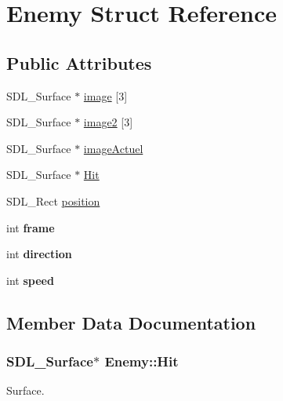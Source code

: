 \hypertarget{structEnemy}{}\section{Enemy Struct Reference}
\label{structEnemy}
\subsection*{Public Attributes}
\begin{DoxyCompactItemize}
\item 
S\+D\+L\+\_\+\+Surface $\ast$ \hyperlink{structEnemy_afc1cf868e4b6602d2166ee9cfbf1d06e}{image} \mbox{[}3\mbox{]}
\item 
S\+D\+L\+\_\+\+Surface $\ast$ \hyperlink{structEnemy_a43bdca7bc81657fccdb7d8cb7369f673}{image2} \mbox{[}3\mbox{]}
\item 
S\+D\+L\+\_\+\+Surface $\ast$ \hyperlink{structEnemy_ab8d7f9eceeef8f17331210f3f1fd2cf3}{image\+Actuel}
\item 
S\+D\+L\+\_\+\+Surface $\ast$ \hyperlink{structEnemy_a62ed00c1aa4ac7bb90cb132c6c56b21d}{Hit}
\item 
S\+D\+L\+\_\+\+Rect \hyperlink{structEnemy_ac364f2ddf130c8622889deca0b6ba4d0}{position}
\item 
int {\bfseries frame}\hypertarget{structEnemy_a554574b1537da808a14f909b8a701735}{}\label{structEnemy_a554574b1537da808a14f909b8a701735}

\item 
int {\bfseries direction}\hypertarget{structEnemy_a1de1605c4b41f74c3b0f4023258323ab}{}\label{structEnemy_a1de1605c4b41f74c3b0f4023258323ab}

\item 
int {\bfseries speed}\hypertarget{structEnemy_a6091c94dbb2017ae60c8e513e6a66be1}{}\label{structEnemy_a6091c94dbb2017ae60c8e513e6a66be1}

\end{DoxyCompactItemize}


\subsection{Member Data Documentation}
\subsubsection[{\texorpdfstring{Hit}{Hit}}]{\setlength{\rightskip}{0pt plus 5cm}S\+D\+L\+\_\+\+Surface$\ast$ Enemy\+::\+Hit}\hypertarget{structEnemy_a62ed00c1aa4ac7bb90cb132c6c56b21d}{}\label{structEnemy_a62ed00c1aa4ac7bb90cb132c6c56b21d}
Surface. 
